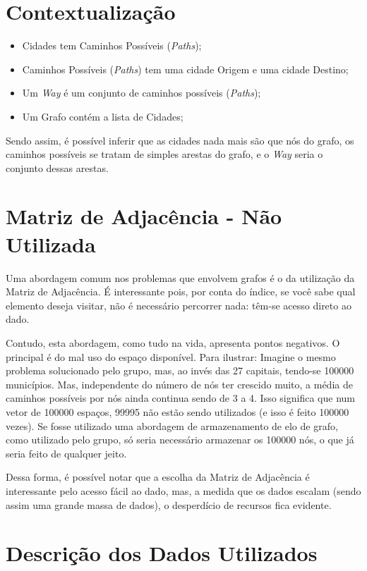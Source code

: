 \section{Contextualização}
\begin{itemize}
  \item Cidades tem Caminhos Possíveis (\textit{Paths});
  \item Caminhos Possíveis (\textit{Paths}) tem uma cidade Origem e uma cidade Destino;
  \item Um \textit{Way} é um conjunto de caminhos possíveis (\textit{Paths});
  \item Um Grafo contém a lista de Cidades;
\end{itemize}

Sendo assim, é possível inferir que as cidades nada mais são que nós do grafo, os caminhos possíveis se tratam de simples arestas do grafo, e o \textit{Way} seria o conjunto dessas arestas.

\section{Matriz de Adjacência - Não Utilizada}
Uma abordagem comum nos problemas que envolvem grafos é o da utilização da Matriz de Adjacência. É interessante pois, por conta do índice, se você sabe qual elemento deseja visitar, não é necessário percorrer nada: têm-se acesso direto ao dado.

Contudo, esta abordagem, como tudo na vida, apresenta pontos negativos. O principal é do mal uso do espaço disponível. Para ilustrar: Imagine o mesmo problema solucionado pelo grupo, mas, ao invés das 27 capitais, tendo-se 100000 municípios. Mas, independente do número de nós ter crescido muito, a média de caminhos possíveis por nós ainda continua sendo de 3 a 4. Isso significa que num vetor de 100000 espaços, 99995 não estão sendo utilizados (e isso é feito 100000 vezes). Se fosse utilizado uma abordagem de armazenamento de elo de grafo, como utilizado pelo grupo, só seria necessário armazenar os 100000 nós, o que já seria feito de qualquer jeito.

Dessa forma, é possível notar que a escolha da Matriz de Adjacência é interessante pelo acesso fácil ao dado, mas, a medida que os dados escalam (sendo assim uma grande massa de dados), o desperdício de recursos fica evidente.

\section{Descrição dos Dados Utilizados}

